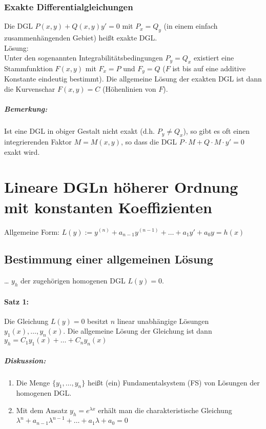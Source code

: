 \subsubsection{Exakte Differentialgleichungen}
Die DGL $P(x,y)+Q(x,y)y'=0$ mit $P_x=Q_y$ (in einem einfach zusammenhängenden Gebiet) heißt exakte DGL.\\
Lösung:\\
Unter den sogenannten Integrabilitätsbedingungen $P_y=Q_x$ existiert eine Stammfunktion $F(x,y)$ mit $F_x=P$ und $F_y=Q$ ($F$ ist bis auf eine additive Konstante eindeutig bestimmt). Die allgemeine Lösung der exakten DGL ist dann die Kurvenschar $\boxed{F(x,y)=C}$ (Höhenlinien von $F$).
\subparagraph{Bemerkung:} Ist eine DGL in obiger Gestalt nicht exakt (d.h. $P_y\not = Q_x$), so gibt es oft einen integrierenden Faktor $M=M(x,y)$, so dass die DGL $P\cdot M+Q\cdot M\cdot y'=0$ exakt wird.

\section{Lineare DGLn höherer Ordnung mit konstanten Koeffizienten}
Allgemeine Form: $L(y):= y^{(n)}+a_{n-1}y^{(n-1)}+\dots + a_1y' + a_0 y = h(x)$
\subsection*{Bestimmung einer allgemeinen Lösung} … $y_h$ der zugehörigen homogenen DGL $L(y)=0$.
\paragraph{Satz 1:} Die Gleichung $L(y)=0$ besitzt $n$ linear unabhängige Lösungen $y_1(x),\dots, y_n(x)$. Die allgemeine Lösung der Gleichung ist dann $y_h=C_1y_1(x)+\dots + C_ny_n(x)$
\subparagraph{Diskussion:} 
\begin{enumerate}
\item Die Menge $\{y_1,\dots,y_n\}$ heißt (ein) Fundamentalsystem (FS) von Lösungen der homogenen DGL.
\item Mit dem Ansatz $y_h=e^{\lambda x}$ erhält man die charakteristische Gleichung $\lambda^n + a_{n-1}\lambda^{n-1}+\dots + a_1\lambda + a_0 = 0$
\end{enumerate}
